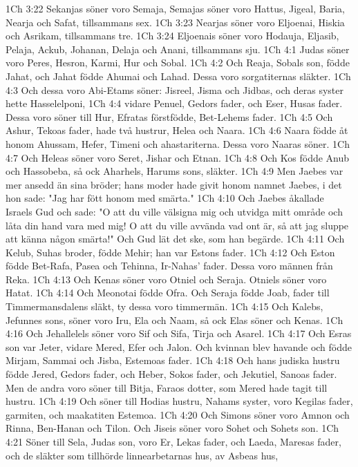 1Ch 3:22  Sekanjas söner voro Semaja, Semajas söner voro Hattus, Jigeal, Baria, Nearja och Safat, tillsammans sex.
1Ch 3:23  Nearjas söner voro Eljoenai, Hiskia och Asrikam, tillsammans tre.
1Ch 3:24  Eljoenais söner voro Hodauja, Eljasib, Pelaja, Ackub, Johanan, Delaja och Anani, tillsammans sju.
1Ch 4:1  Judas söner voro Peres, Hesron, Karmi, Hur och Sobal.
1Ch 4:2  Och Reaja, Sobals son, födde Jahat, och Jahat födde Ahumai och Lahad. Dessa voro sorgatiternas släkter.
1Ch 4:3  Och dessa voro Abi-Etams söner: Jisreel, Jisma och Jidbas, och deras syster hette Hasselelponi,
1Ch 4:4  vidare Penuel, Gedors fader, och Eser, Husas fader. Dessa voro söner till Hur, Efratas förstfödde, Bet-Lehems fader.
1Ch 4:5  Och Ashur, Tekoas fader, hade två hustrur, Helea och Naara.
1Ch 4:6  Naara födde åt honom Ahussam, Hefer, Timeni och ahastariterna. Dessa voro Naaras söner.
1Ch 4:7  Och Heleas söner voro Seret, Jishar och Etnan.
1Ch 4:8  Och Kos födde Anub och Hassobeba, så ock Aharhels, Harums sons, släkter.
1Ch 4:9  Men Jaebes var mer ansedd än sina bröder; hans moder hade givit honom namnet Jaebes, i det hon sade: "Jag har fött honom med smärta."
1Ch 4:10  Och Jaebes åkallade Israels Gud och sade: "O att du ville välsigna mig och utvidga mitt område och låta din hand vara med mig! O att du ville avvända vad ont är, så att jag sluppe att känna någon smärta!" Och Gud lät det ske, som han begärde.
1Ch 4:11  Och Kelub, Suhas broder, födde Mehir; han var Estons fader.
1Ch 4:12  Och Eston födde Bet-Rafa, Pasea och Tehinna, Ir-Nahas' fader. Dessa voro männen från Reka.
1Ch 4:13  Och Kenas söner voro Otniel och Seraja. Otniels söner voro Hatat.
1Ch 4:14  Och Meonotai födde Ofra. Och Seraja födde Joab, fader till Timmermansdalens släkt, ty dessa voro timmermän.
1Ch 4:15  Och Kalebs, Jefunnes sons, söner voro Iru, Ela och Naam, så ock Elas söner och Kenas.
1Ch 4:16  Och Jehallelels söner voro Sif och Sifa, Tirja och Asarel.
1Ch 4:17  Och Esras son var Jeter, vidare Mered, Efer och Jalon. Och kvinnan blev havande och födde Mirjam, Sammai och Jisba, Estemoas fader.
1Ch 4:18  Och hans judiska hustru födde Jered, Gedors fader, och Heber, Sokos fader, och Jekutiel, Sanoas fader. Men de andra voro söner till Bitja, Faraos dotter, som Mered hade tagit till hustru.
1Ch 4:19  Och söner till Hodias hustru, Nahams syster, voro Kegilas fader, garmiten, och maakatiten Estemoa.
1Ch 4:20  Och Simons söner voro Amnon och Rinna, Ben-Hanan och Tilon. Och Jiseis söner voro Sohet och Sohets son.
1Ch 4:21  Söner till Sela, Judas son, voro Er, Lekas fader, och Laeda, Maresas fader, och de släkter som tillhörde linnearbetarnas hus, av Asbeas hus,
